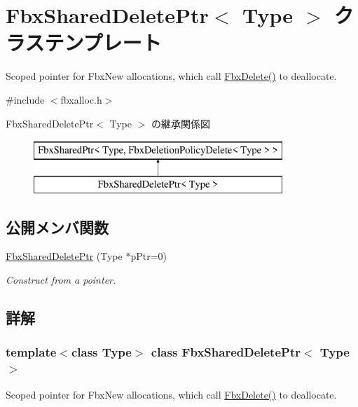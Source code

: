 \hypertarget{class_fbx_shared_delete_ptr}{}\section{Fbx\+Shared\+Delete\+Ptr$<$ Type $>$ クラステンプレート}
\label{class_fbx_shared_delete_ptr}


Scoped pointer for Fbx\+New allocations, which call \hyperlink{fbxalloc_8h_a55138f34ac93c519a78f624178c128d6}{Fbx\+Delete()} to deallocate.  




{\ttfamily \#include $<$fbxalloc.\+h$>$}

Fbx\+Shared\+Delete\+Ptr$<$ Type $>$ の継承関係図\begin{figure}[H]
\begin{center}
\leavevmode
\includegraphics[height=2.000000cm]{class_fbx_shared_delete_ptr}
\end{center}
\end{figure}
\subsection*{公開メンバ関数}
\begin{DoxyCompactItemize}
\item 
\hyperlink{class_fbx_shared_delete_ptr_a35665b463cbb2e437b4bf3a228de8678}{Fbx\+Shared\+Delete\+Ptr} (Type $\ast$p\+Ptr=0)
\begin{DoxyCompactList}\small\item\em Construct from a pointer. \end{DoxyCompactList}\end{DoxyCompactItemize}


\subsection{詳解}
\subsubsection*{template$<$class Type$>$\newline
class Fbx\+Shared\+Delete\+Ptr$<$ Type $>$}

Scoped pointer for Fbx\+New allocations, which call \hyperlink{fbxalloc_8h_a55138f34ac93c519a78f624178c128d6}{Fbx\+Delete()} to deallocate. 

